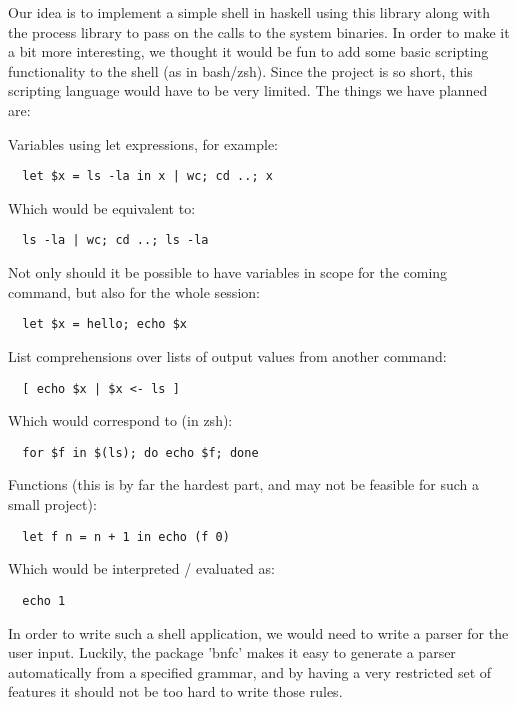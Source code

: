 \documentclass[11pt,a4paper]{article}
\begin{document}
Our idea is to implement a simple shell in haskell using this library along with
the process library to pass on the calls to the system binaries. In order to
make it a bit more interesting, we thought it would be fun to add some basic
scripting functionality to the shell (as in bash/zsh). Since the project is so
short, this scripting language would have to be very limited. The things we have
planned are:

Variables using let expressions, for example:
\begin{verbatim}
  let $x = ls -la in x | wc; cd ..; x
\end{verbatim}

Which would be equivalent to:

\begin{verbatim}
  ls -la | wc; cd ..; ls -la
\end{verbatim}

Not only should it be possible to have variables in scope for the coming
command, but also for the whole session:

\begin{verbatim}
  let $x = hello; echo $x
\end{verbatim}

List comprehensions over lists of output values from another command:

\begin{verbatim}
  [ echo $x | $x <- ls ]
\end{verbatim}

Which would correspond to (in zsh):

\begin{verbatim}
  for $f in $(ls); do echo $f; done
\end{verbatim}

Functions (this is by far the hardest part, and may not be feasible for such a
small project):

\begin{verbatim}
  let f n = n + 1 in echo (f 0)
\end{verbatim}

Which would be interpreted / evaluated as:

\begin{verbatim}
  echo 1
\end{verbatim}

In order to write such a shell application, we would need to write a parser for
the user input. Luckily, the package 'bnfc' makes it easy to generate a parser
automatically from a specified grammar, and by having a very restricted set of
features it should not be too hard to write those rules.
\end{document}
